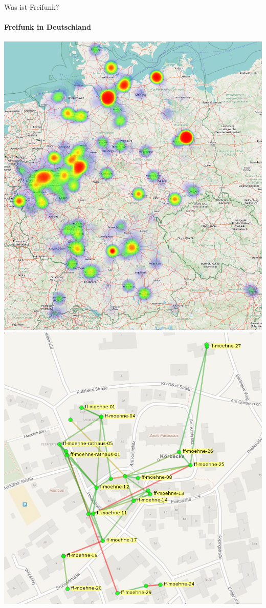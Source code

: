 \documentclass[]{beamer}
\begin{document}
\begin{frame}{Was ist Freifunk?}
\framesubtitle{Freifunk in Deutschland}
\includegraphics[height=0.6\textheight]{images/heatmap_germany} \hfill
\includegraphics[height=0.6\textheight]{images/ffmap_moehne}
\end{frame}
\end{document}
